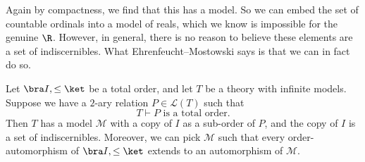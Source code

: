 \documentclass[a4paper]{article}
\begin{document}
Again by compactness, we find that this has a model. So we can embed the set of countable ordinals into a model of reals, which we know is impossible for the genuine $\R$. However, in general, there is no reason to believe these elements are a set of indiscernibles. What Ehrenfeucht--Mostowski says is that we can in fact do so.

\begin{thm}
  Let $\bra I, \leq\ket$ be a total order, and let $T$ be a theory with infinite models. Suppose we have a $2$-ary relation $P \in \mathcal{L}(T)$ such that
  \[
    T \vdash \text{$P$ is a total order}.
  \]
  Then $T$ has a model $\mathcal{M}$ with a copy of $I$ as a sub-order of $P$, and the copy of $I$ is a set of indiscernibles. Moreover, we can pick $\mathcal{M}$ such that every order-automorphism of $\bra I, \leq \ket$ extends to an automorphism of $\mathcal{M}$.
\end{thm}
\end{document}
